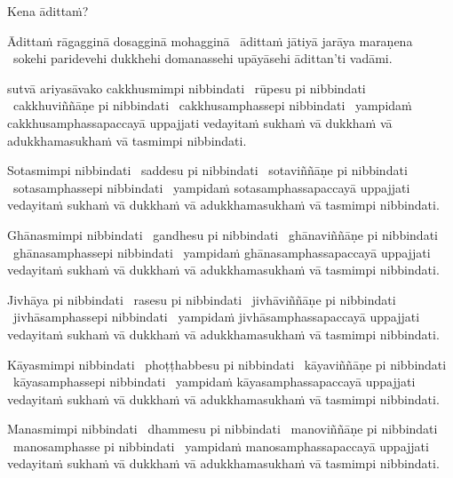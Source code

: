 Kena ādittaṁ?

\begin{pali-hang}
Ādittaṁ rāgagginā dosagginā mohagginā \breathmark\ ādittaṁ jātiyā jarāya maraṇena \breathmark\ sokehi paridevehi dukkhehi domanassehi upāyāsehi ādittan'ti vadāmi.
\end{pali-hang}

\begin{pali-hang}
 sutvā ariyasāvako cakkhusmimpi nibbindati \breathmark\ rūpesu pi nibbindati \breathmark\ cakkhuviññāṇe pi nibbindati \breathmark\ cakkhusamphassepi nibbindati \breathmark\ yampidaṁ cakkhusamphassapaccayā uppajjati vedayitaṁ sukhaṁ vā dukkhaṁ vā adukkhamasukhaṁ vā tasmimpi nibbindati.
\end{pali-hang}

\begin{pali-hang}
Sotasmimpi nibbindati \breathmark\ saddesu pi nibbindati \breathmark\ sotaviññāṇe pi nibbindati \breathmark\ sotasamphassepi nibbindati \breathmark\ yampidaṁ sotasamphassapaccayā uppajjati vedayitaṁ sukhaṁ vā dukkhaṁ vā adukkhamasukhaṁ vā tasmimpi nibbindati.
\end{pali-hang}

\begin{pali-hang}
Ghānasmimpi nibbindati \breathmark\ gandhesu pi nibbindati \breathmark\ ghānaviññāṇe pi nibbindati \breathmark\ ghānasamphassepi nibbindati \breathmark\ yampidaṁ ghānasamphassapaccayā uppajjati vedayitaṁ sukhaṁ vā dukkhaṁ vā adukkhamasukhaṁ vā tasmimpi nibbindati.
\end{pali-hang}

\begin{pali-hang}
Jivhāya pi nibbindati \breathmark\ rasesu pi nibbindati \breathmark\ jivhāviññāṇe pi nibbindati \breathmark\ jivhāsamphassepi nibbindati \breathmark\ yampidaṁ jivhāsamphassapaccayā uppajjati vedayitaṁ sukhaṁ vā dukkhaṁ vā adukkhamasukhaṁ vā tasmimpi nibbindati.
\end{pali-hang}

\begin{pali-hang}
Kāyasmimpi nibbindati \breathmark\ phoṭṭhabbesu pi nibbindati \breathmark\ kāyaviññāṇe pi nibbindati \breathmark\ kāyasamphassepi nibbindati \breathmark\ yampidaṁ kāyasamphassapaccayā uppajjati vedayitaṁ sukhaṁ vā dukkhaṁ vā adukkhamasukhaṁ vā tasmimpi nibbindati.
\end{pali-hang}

\begin{pali-hang}
Manasmimpi nibbindati \breathmark\ dhammesu pi nibbindati \breathmark\ manoviññāṇe pi nibbindati \breathmark\ manosamphasse pi nibbindati \breathmark\ yampidaṁ manosamphassapaccayā uppajjati vedayitaṁ sukhaṁ vā dukkhaṁ vā adukkhamasukhaṁ vā tasmimpi nibbindati.
\end{pali-hang}

